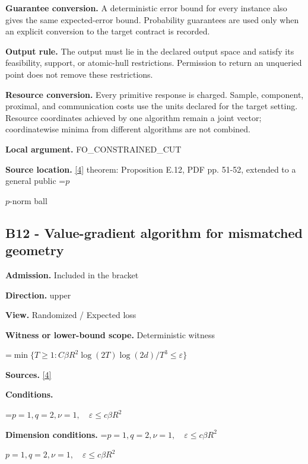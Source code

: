 \documentclass[10pt,a4paper]{article}
\newcommand{\AtlasMath}[1]{\par\begingroup\centering\setbox0=\hbox{$\displaystyle #1$}\ifdim\wd0>1.4\linewidth\typeout{ATLAS WIDE FORMULA: \the\wd0}\fi\ifdim\wd0>\linewidth\resizebox{\linewidth}{!}{\box0}\else\box0\fi\par\endgroup}
\newcommand{\AtlasInlineMath}[1]{\begingroup\setbox0=\hbox{$#1$}\ifdim\wd0>.4\linewidth\endgroup\AtlasMath{#1}\else\endgroup$#1$\fi}
\begin{document}
\textbf{Guarantee conversion.} A deterministic error bound for every instance also gives the same expected-error bound. Probability guarantees are used only when an explicit conversion to the target contract is recorded.



\textbf{Output rule.} The output must lie in the declared output space and satisfy its feasibility, support, or atomic-hull restrictions. Permission to return an unqueried point does not remove these restrictions.



\textbf{Resource conversion.} Every primitive response is charged. Sample, component, proximal, and communication costs use the units declared for the target setting. Resource coordinates achieved by one algorithm remain a joint vector; coordinatewise minima from different algorithms are not combined.



\textbf{Local argument.} FO\_CONSTRAINED\_CUT



\textbf{Source location.} \href{https://arxiv.org/pdf/2609.32910}{[4]} theorem: Proposition E.12, PDF pp. 51-52, extended to a general public \AtlasInlineMath{p}-norm ball



\subsection{B12 - Value-gradient algorithm for mismatched geometry}


\textbf{Admission.} Included in the bracket



\textbf{Direction.} upper



\textbf{View.} Randomized / Expected loss



\textbf{Witness or lower-bound scope.} Deterministic witness



\AtlasMath{\min\{T\ge1:C\beta R^2\log(2T)\log(2d)/T^3\le\varepsilon\}}


\textbf{Sources.} \href{https://arxiv.org/pdf/2609.32910}{[4]}



\textbf{Conditions.}
\AtlasMath{p=1,q=2,\nu=1,\quad\varepsilon\le c\beta R^2}




\textbf{Dimension conditions.} \AtlasInlineMath{p=1,q=2,\nu=1,\quad\varepsilon\le c\beta R^2}
\end{document}

